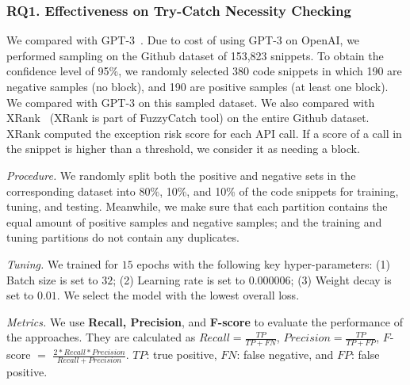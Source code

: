 \subsubsection{RQ1. Effectiveness on Try-Catch Necessity Checking}

 We compared {\xblock} with
GPT-3~\cite{tien}. Due to cost of using GPT-3 on OpenAI, we performed
sampling on the Github dataset of 153,823 snippets. To obtain the
confidence level of 95\%, we randomly selected 380 code snippets in
which 190 are negative samples (no  block), and 190
are positive samples (at least one  block). We
compared with GPT-3 on this sampled dataset.
We also compared {\xblock} with XRank~\cite{xrank-fse20} (XRank is
part of FuzzyCatch tool) on the entire Github dataset. XRank computed
the exception risk score for each API call. If a score of a call in
the snippet is higher than a threshold, we consider it as needing a
 block.

{\em Procedure.} We randomly split both the positive and negative sets
in the corresponding dataset into 80\%, 10\%, and 10\% of the code
snippets for training, tuning, and testing. Meanwhile, we make sure
that each partition contains the equal amount of positive samples and
negative samples; and the training and tuning partitions do not
contain any duplicates.



{\em Tuning.} We trained {\tool} for $15$ epochs with the following key hyper-parameters: (1) Batch size is set to $32$; (2) Learning rate is set to $0.000006$; (3) Weight decay is set to $0.01$. We select the model with the lowest overall loss. 


{\em Metrics.} We use \textbf{Recall, Precision}, and {\bf F-score} to
evaluate the performance of the approaches. They are calculated as
$Recall = \frac{TP}{TP+FN}$, $Precision = \frac{TP}{TP+FP}$, $F$-score
$=$ $\frac{2*Recall*Precision}{Recall+Precision}$. $TP$: true
positive, $FN$: false negative, and $FP$: false positive.
